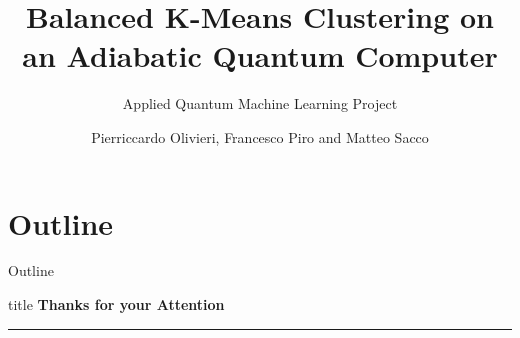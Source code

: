 

\title{\Large \textbf{Balanced K-Means Clustering on an Adiabatic Quantum Computer}}
\subtitle{Applied Quantum Machine Learning Project}



\author{Pierriccardo Olivieri, Francesco Piro and Matteo Sacco}


	
{
	\frame{\titlepage}
}

\section*{Outline}
	\begin{frame}{Outline}
		\vspace{-1cm}
		\textbf{\tableofcontents}
	\end{frame}

\clearpage


\clearpage


\clearpage


\begin{frame}[plain]
	\vfill
	\centering
	\begin{beamercolorbox}[sep=8pt,center,shadow=true,rounded=true]{title}
		\textbf{Thanks for your Attention}\par%
		\color{polimiblue}\noindent\rule{10cm}{1pt} \\
	\end{beamercolorbox}
	\vfill
\end{frame}




